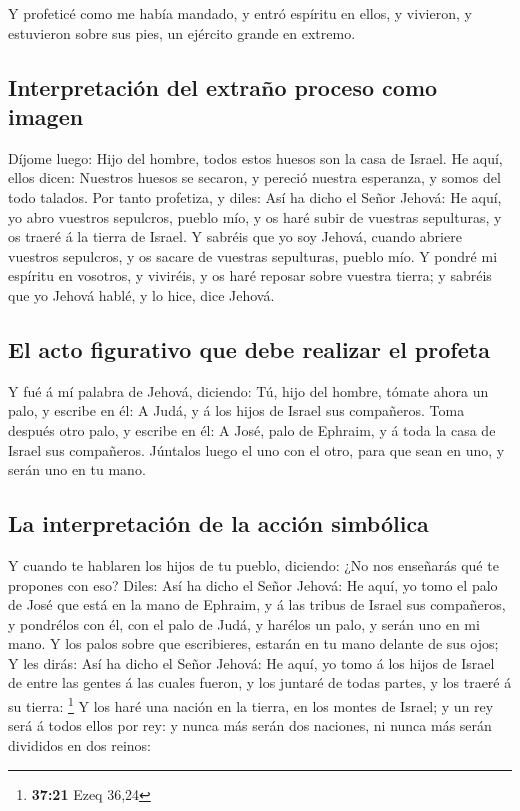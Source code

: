  Y profeticé como me había mandado, y entró espíritu en
ellos, y vivieron, y estuvieron sobre sus pies, un ejército grande en
extremo.

\hypertarget{interpretaciuxf3n-del-extrauxf1o-proceso-como-imagen}{%
\subsection{Interpretación del extraño proceso como
imagen}\label{interpretaciuxf3n-del-extrauxf1o-proceso-como-imagen}}

 Díjome luego: Hijo del hombre, todos estos huesos son la
casa de Israel. He aquí, ellos dicen: Nuestros huesos se secaron, y
pereció nuestra esperanza, y somos del todo talados.  Por
tanto profetiza, y diles: Así ha dicho el Señor Jehová: He aquí, yo abro
vuestros sepulcros, pueblo mío, y os haré subir de vuestras sepulturas,
y os traeré á la tierra de Israel.  Y sabréis que yo soy
Jehová, cuando abriere vuestros sepulcros, y os sacare de vuestras
sepulturas, pueblo mío.  Y pondré mi espíritu en vosotros,
y viviréis, y os haré reposar sobre vuestra tierra; y sabréis que yo
Jehová hablé, y lo hice, dice Jehová.

\hypertarget{el-acto-figurativo-que-debe-realizar-el-profeta}{%
\subsection{El acto figurativo que debe realizar el
profeta}\label{el-acto-figurativo-que-debe-realizar-el-profeta}}

 Y fué á mí palabra de Jehová, diciendo:  Tú,
hijo del hombre, tómate ahora un palo, y escribe en él: A Judá, y á los
hijos de Israel sus compañeros. Toma después otro palo, y escribe en él:
A José, palo de Ephraim, y á toda la casa de Israel sus compañeros.
 Júntalos luego el uno con el otro, para que sean en uno, y
serán uno en tu mano.

\hypertarget{la-interpretaciuxf3n-de-la-acciuxf3n-simbuxf3lica}{%
\subsection{La interpretación de la acción
simbólica}\label{la-interpretaciuxf3n-de-la-acciuxf3n-simbuxf3lica}}

 Y cuando te hablaren los hijos de tu pueblo, diciendo: ¿No
nos enseñarás qué te propones con eso?  Diles: Así ha dicho
el Señor Jehová: He aquí, yo tomo el palo de José que está en la mano de
Ephraim, y á las tribus de Israel sus compañeros, y pondrélos con él,
con el palo de Judá, y harélos un palo, y serán uno en mi mano.
 Y los palos sobre que escribieres, estarán en tu mano
delante de sus ojos;  Y les dirás: Así ha dicho el Señor
Jehová: He aquí, yo tomo á los hijos de Israel de entre las gentes á las
cuales fueron, y los juntaré de todas partes, y los traeré á su tierra:
\footnote{\textbf{37:21} Ezeq 36,24}  Y los haré una nación
en la tierra, en los montes de Israel; y un rey será á todos ellos por
rey: y nunca más serán dos naciones, ni nunca más serán divididos en dos
reinos:

